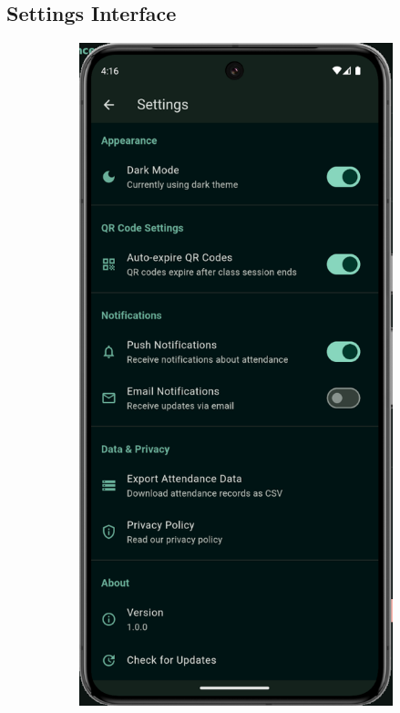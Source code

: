 \subsection{Settings Interface}\nopagebreak[4]
\vspace{0.5cm}
\begin{figure}[H]
    \centering
    \begin{subfigure}[b]{0.35\textwidth}
        \includegraphics[width=\textwidth]{images/rachid/teacher-side-settings.png}

\end{subfigure}
\end{figure}

